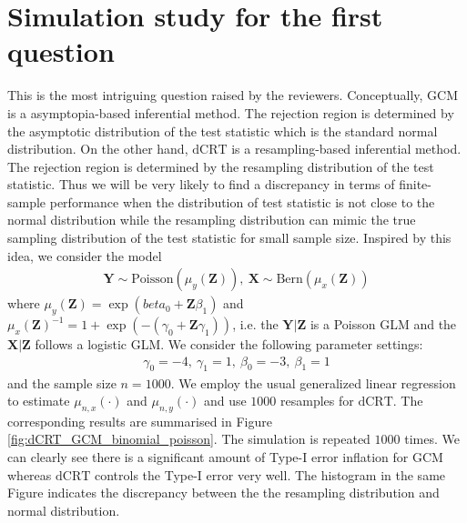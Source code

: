 \documentclass{article}
\begin{document}
\section{Simulation study for the first question}

This is the most intriguing question raised by the reviewers. Conceptually, $\mathrm{GCM}$ is a asymptopia-based
inferential method. The rejection region is determined by the asymptotic distribution of the test statistic which 
is the standard normal distribution. On the other hand, $\mathrm{dCRT}$ is a resampling-based inferential method. 
The rejection region is determined by the resampling distribution of the test statistic. Thus we will be very likely 
to find a discrepancy in terms of finite-sample performance when the distribution of test statistic is not close to 
the normal distribution while the resampling distribution can mimic the true sampling 
distribution of the test statistic for small sample size. Inspired by this idea, we consider the model 
\begin{align*}
    \bm Y \sim \text{Poisson}(\mu_y(\bm Z)),\ \bm X\sim \text{Bern}(\mu_x(\bm Z))
\end{align*}
where $\mu_y(\bm Z) = \exp(beta_0+ \bm Z \beta_1)$ and $\mu_x(\bm Z)^{-1} = 1+\exp(-(\gamma_0+\bm Z\gamma_1))$, i.e. 
the $\bm Y|\bm Z$ is a Poisson GLM and the $\bm X|\bm Z$ follows a logistic GLM. We consider the following parameter 
settings:
\begin{align*}
    \gamma_0=-4,\ \gamma_1=1,\ \beta_0=-3,\ \beta_1=1
\end{align*}
and the sample size $n=1000$. We employ the usual generalized linear regression to estimate $\mu_{n,x}(\cdot)$ and $\mu_{n,y}(\cdot)$
and use $1000$ resamples for $\mathrm{dCRT}$. The corresponding results are summarised in Figure \ref{fig:dCRT_GCM_binomial_poisson}.
The simulation is repeated $1000$ times. We can clearly see there is a significant amount of Type-I error inflation for $\mathrm{GCM}$
whereas $\mathrm{dCRT}$ controls the Type-I error very well. The histogram in the same Figure indicates the discrepancy between the 
the resampling distribution and normal distribution.  
\end{document}
